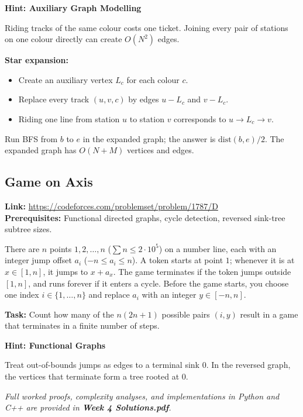 \documentclass[12pt]{article}
\begin{document}
\textbf{Hint: Auxiliary Graph Modelling}

Riding tracks of the same colour costs one ticket. Joining every pair of stations on one colour directly can create $O(N^2)$ edges.

\textbf{Star expansion:}
\begin{itemize}
    \item Create an auxiliary vertex $L_c$ for each colour $c$.
    \item Replace every track $(u,v,c)$ by edges $u-L_c$ and $v-L_c$.
    \item Riding one line from station $u$ to station $v$ corresponds to $u \to L_c \to v$.
\end{itemize}
Run BFS from $b$ to $e$ in the expanded graph; the answer is $\text{dist}(b,e)/2$. The expanded graph has $O(N+M)$ vertices and edges.

\subsection{Game on Axis}
\textbf{Link:} \url{https://codeforces.com/problemset/problem/1787/D} \\
\textbf{Prerequisites:} Functional directed graphs, cycle detection, reversed sink-tree subtree sizes.

There are $n$ points $1, 2, \dots, n$ ($\sum n \le 2 \cdot 10^5$) on a number line, each with an integer jump offset $a_i$ ($-n \le a_i \le n$). A token starts at point $1$; whenever it is at $x \in [1, n]$, it jumps to $x + a_x$. The game terminates if the token jumps outside $[1, n]$, and runs forever if it enters a cycle. Before the game starts, you choose one index $i \in \{1, \dots, n\}$ and replace $a_i$ with an integer $y \in [-n, n]$.

\textbf{Task:} Count how many of the $n(2n + 1)$ possible pairs $(i, y)$ result in a game that terminates in a finite number of steps.

\textbf{Hint: Functional Graphs}

Treat out-of-bounds jumps as edges to a terminal sink $0$. In the reversed graph, the vertices that terminate form a tree rooted at $0$.

\vspace{0.5em}
\begin{center}
    \textit{Full worked proofs, complexity analyses, and implementations in Python and C++ are provided in \textbf{Week 4 Solutions.pdf}.}
\end{center}
\end{document}
